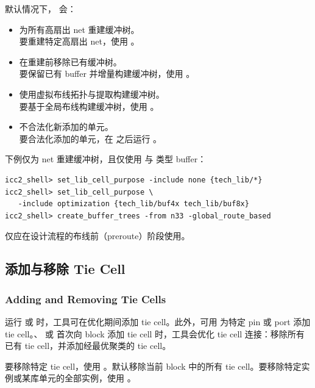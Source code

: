 默认情况下， 会：
\begin{itemize}
  \item 为所有高扇出 net 重建缓冲树。\\
        要重建特定高扇出 net，使用 。
  \item 在重建前移除已有缓冲树。\\
        要保留已有 buffer 并增量构建缓冲树，使用 。
  \item 使用虚拟布线拓扑与提取构建缓冲树。\\
        要基于全局布线构建缓冲树，使用 。
  \item 不合法化新添加的单元。\\
        要合法化添加的单元，在  之后运行 。
\end{itemize}

下例仅为  net 重建缓冲树，且仅使用  与  类型 buffer：
\begin{lstlisting}
icc2_shell> set_lib_cell_purpose -include none {tech_lib/*}
icc2_shell> set_lib_cell_purpose \
   -include optimization {tech_lib/buf4x tech_lib/buf8x}
icc2_shell> create_buffer_trees -from n33 -global_route_based
\end{lstlisting}

\begin{noteBox}
 仅应在设计流程的布线前（preroute）阶段使用。
\end{noteBox}

\subsection{添加与移除 Tie Cell}
\subsubsection*{Adding and Removing Tie Cells}

运行  或  时，工具可在优化期间添加 tie cell。此外，可用  为特定 pin 或 port 添加 tie cell。、 或  首次向 block 添加 tie cell 时，工具会优化 tie cell 连接：移除所有已有 tie cell，并添加经最优聚类的 tie cell。

要移除特定 tie cell，使用 。默认移除当前 block 中的所有 tie cell。要移除特定实例或某库单元的全部实例，使用 。


